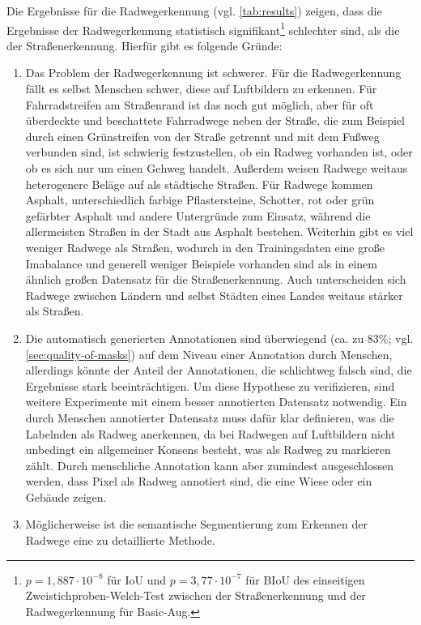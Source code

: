 Die Ergebnisse für die Radwegerkennung (vgl. \autoref{tab:results}) zeigen, dass die Ergebnisse der 
Radwegerkennung statistisch signifikant\footnote{
	$p = 1,887\cdot 10^{-8}$ für IoU und $p = 3,77\cdot 10^{-7}$ für BIoU
	des einseitigen Zweistichproben-Welch-Test zwischen der Straßenerkennung 
	und der Radwegerkennung für Basic-Aug. 
} schlechter sind, als die der Straßenerkennung. Hierfür gibt es folgende Gründe:
\begin{enumerate}
	\item Das Problem der Radwegerkennung ist schwerer. Für die Radwegerkennung fällt es selbst Menschen schwer, 
	diese auf Luftbildern zu erkennen. Für Fahrradstreifen am Straßenrand ist das noch gut möglich, 
	aber für oft überdeckte und beschattete Fahrradwege neben der Straße, die zum Beispiel durch einen Grünstreifen 
	von der Straße getrennt und mit dem Fußweg verbunden sind, ist schwierig festzustellen, ob ein Radweg 
	vorhanden ist, oder ob es sich nur um einen Gehweg handelt. Außerdem weisen Radwege weitaus 
	heterogenere Beläge auf als städtische Straßen. Für Radwege kommen Asphalt, unterschiedlich farbige Pflastersteine,
	Schotter, rot oder grün gefärbter Asphalt und andere Untergründe zum Einsatz, 
	während die allermeisten Straßen in der Stadt aus Asphalt bestehen.
	Weiterhin gibt es viel weniger Radwege als Straßen, wodurch in den Trainingsdaten eine große Imabalance 
	und generell weniger Beispiele vorhanden sind als in einem ähnlich großen Datensatz für die Straßenerkennung. 
	Auch unterscheiden sich Radwege zwischen Ländern und selbst Städten eines Landes weitaus stärker als Straßen.
	\item Die automatisch generierten Annotationen sind überwiegend (ca. zu 83\%; vgl. \autoref{sec:quality-of-masks})
	auf dem Niveau einer Annotation durch Menschen, allerdings könnte der Anteil der Annotationen, die schlichtweg
	falsch sind, die Ergebnisse stark beeinträchtigen. Um diese Hypothese zu verifizieren, sind weitere 
	Experimente mit einem besser annotierten Datensatz notwendig. Ein durch Menschen annotierter Datensatz 
	muss dafür klar definieren, was die Labelnden als Radweg anerkennen, da bei Radwegen auf Luftbildern 
	nicht unbedingt ein allgemeiner Konsens besteht, was als Radweg zu markieren zählt. Durch menschliche Annotation 
	kann aber zumindest ausgeschlossen werden, dass Pixel als Radweg annotiert sind, die eine Wiese oder ein Gebäude zeigen.
	\item Möglicherweise ist die semantische Segmentierung zum Erkennen der Radwege eine zu detaillierte Methode. 

\end{enumerate}
